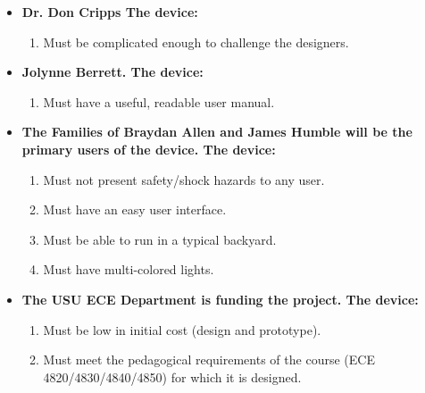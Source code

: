 \begin{itemize}
	\item  {\textbf{Dr. Don Cripps   The device:}}
	\begin{enumerate}
		\item Must be complicated enough to challenge the designers.\\[.5cm]
	\end{enumerate}
	

	
	\item {\textbf{Jolynne Berrett.  The device:}}
	\begin{enumerate}
		\item Must have a useful, readable user manual.\\[.5cm] 
	\end{enumerate}
	
	\item {\textbf{The Families of Braydan Allen and James Humble will be the primary users of the device. The device:}}
	\begin{enumerate}
		\item Must not present safety/shock hazards to any user.
		\item Must have an easy user interface.
		\item Must be able to run in a typical backyard.
		\item Must have multi-colored lights. 
	\end{enumerate}
	
	\item {\textbf{The USU ECE Department is funding the project.  The device:}}
	\begin{enumerate}
		\item Must be low in initial cost (design and prototype).\\[.5cm] 
		\item Must meet the pedagogical requirements of the course (ECE 4820/4830/4840/4850) for which it is designed.\\[.5cm]
	\end{enumerate}
\end{itemize}
